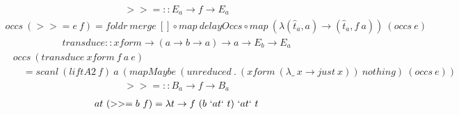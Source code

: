 \documentclass[fleqn]{amsart}
\begin{document}
\begin{align*}
  >>= :: E_a \rightarrow f \rightarrow E_a
\end{align*}
\begin{align*}
  occs\ (>>= e\ f) = foldr\ merge\ []\circ map\ delayOccs\circ map\ (\lambda(\hat{t}_a, a) \rightarrow (\hat{t}_a , f\ a))\ (occs\ e)
\end{align*}
\begin{align*}
  transduce :: xform \rightarrow (a \rightarrow b \rightarrow a) \rightarrow a \rightarrow E_b \rightarrow E_a
\end{align*}
\begin{align*}
  &occs\ (transduce\ xform\ f\ a\ e)\\
  &\quad= scanl\ (liftA2\ f)\ a\ (mapMaybe\ (unreduced\ .\ (xform\ (\lambda\_\ x\rightarrow just\ x))\ nothing)\ (occs\ e))
\end{align*}
\begin{align*}
  >>= :: B_a \rightarrow f \rightarrow B_a
\end{align*}
\begin{align*}
  at\ (>>= b\ f) =\lambda t \rightarrow f\ (b\ `at` \ t)\ `at` \ t
\end{align*}
\end{document}
